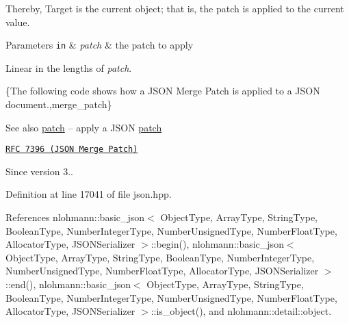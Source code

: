 Thereby, {\ttfamily Target} is the current object; that is, the patch is applied to the current value.


\begin{DoxyParams}[1]{Parameters}
\mbox{\tt in}  & {\em patch} & the patch to apply\\
\hline
\end{DoxyParams}
Linear in the lengths of {\itshape patch}.

\{The following code shows how a J\+S\+ON Merge Patch is applied to a J\+S\+ON document.,merge\+\_\+patch\}

\begin{DoxySeeAlso}{See also}
\hyperlink{classnlohmann_1_1basic__json_a81e0c41a4a9dff4df2f6973f7f8b2a83}{patch} -- apply a J\+S\+ON \hyperlink{classnlohmann_1_1basic__json_a81e0c41a4a9dff4df2f6973f7f8b2a83}{patch} 

\href{https://tools.ietf.org/html/rfc7396}{\tt R\+FC 7396 (J\+S\+ON Merge Patch)}
\end{DoxySeeAlso}
\begin{DoxySince}{Since}
version 3.. 
\end{DoxySince}


Definition at line 17041 of file json.\+hpp.



References nlohmann\+::basic\+\_\+json$<$ Object\+Type, Array\+Type, String\+Type, Boolean\+Type, Number\+Integer\+Type, Number\+Unsigned\+Type, Number\+Float\+Type, Allocator\+Type, J\+S\+O\+N\+Serializer $>$\+::begin(), nlohmann\+::basic\+\_\+json$<$ Object\+Type, Array\+Type, String\+Type, Boolean\+Type, Number\+Integer\+Type, Number\+Unsigned\+Type, Number\+Float\+Type, Allocator\+Type, J\+S\+O\+N\+Serializer $>$\+::end(), nlohmann\+::basic\+\_\+json$<$ Object\+Type, Array\+Type, String\+Type, Boolean\+Type, Number\+Integer\+Type, Number\+Unsigned\+Type, Number\+Float\+Type, Allocator\+Type, J\+S\+O\+N\+Serializer $>$\+::is\+\_\+object(), and nlohmann\+::detail\+::object.


